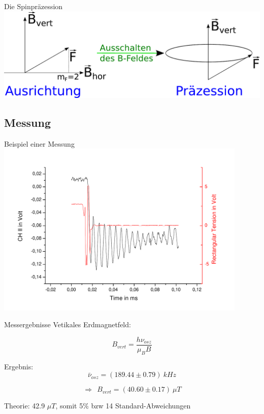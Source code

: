 \documentclass{beamer}
\begin{document}
\begin{frame}{Die Spinpräzession}
\centering \includegraphics[width=\textwidth]{Bilder/praez.pdf}
\end{frame}

\subsection{Messung}
\begin{frame}{Beispiel einer Messung}
\centering \includegraphics[width=0.9\textwidth]{Bilder/Spinpr.pdf}
\end{frame}

\begin{frame}{Messergebnisse}
Vetikales Erdmagnetfeld:

$$ B_{vert} = \frac{h\nu_{osz}}{\mu_BB} $$

\pause Ergebnis: $$\bar\nu_{osz} = (189.44 \pm 0.79)\ kHz$$

$$\Rightarrow\ \ \boxed{B_{vert} = (40.60 \pm 0.17)\ \mu T}$$ 

Theorie: 42.9 $\mu T$, somit 5\% bzw 14 Standard-Abweichungen
\end{frame}
\end{document}

